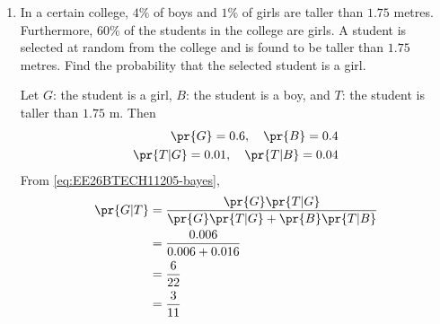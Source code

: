 \begin{enumerate}[label=\thesubsection.\arabic*, ref=\thesubsection.\theenumi, itemsep=3ex]
\item
In a certain college, $4\%$ of boys and $1\%$ of girls are taller than $1.75$ metres. Furthermore, $60\%$ of the students in the college are girls. A student is selected at random from the college and is found to be taller than $1.75$ metres. Find the probability that the selected student is a girl.

\medskip
\solution Let $G$: the student is a girl, $B$: the student is a boy, and $T$: the student is taller than $1.75$ m. Then
\begin{align}
	\pr{G} = 0.6,\quad \pr{B} = 0.4
	\\
	\pr{T|G} = 0.01,\quad \pr{T|B} = 0.04
\end{align}
From \eqref{eq:EE26BTECH11205-bayes},
\begin{align}
	\pr{G|T} &= \frac{\pr{G}\pr{T|G}}{\pr{G}\pr{T|G} + \pr{B}\pr{T|B}} \notag
	\\
	&= \frac{0.006}{0.006 + 0.016} \notag
	\\
	&= \frac{6}{22} \notag
	\\
	&= \frac{3}{11}
\end{align}

\end{enumerate}
